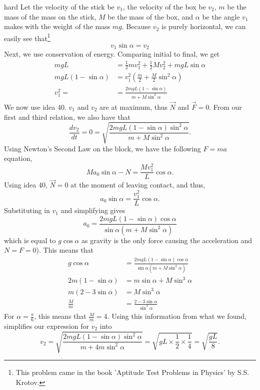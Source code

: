\begin{solution}{hard}
Let the velocity of the stick be $v_1$, the velocity of the box be $v_2$, $m$ be the mass of the mass on the stick, $M$ be the mass of the box, and $\alpha$ be the angle $v_1$ makes with the weight of the mass $mg$. Because $v_2$ is purely horizontal, we can easily see that\footnote{This problem came in the book 'Aptitude Test Problems in Physics' by S.S. Krotov.}
\[v_1\sin\alpha = v_2\]
Next, we use conservation of energy. Comparing initial to final, we get
\begin{align*}
mgL&= \frac{1}{2}mv_1^2 + \frac{1}{2}Mv_2^2 + mgL\sin\alpha\\
mgL(1 - \sin\alpha)&= v_1^2\left(\frac{m}{2} + \frac{M}{2}\sin^2\alpha\right)\\
v_1^2=&= \frac{2mgL(1 - \sin\alpha)}{m + M\sin^2\alpha}
\end{align*}
We now use idea 40. $v_1$ and $v_2$ are at maximum, thus $\vec{N}$ and $\vec{F} = 0$. From our first and third relation, we also have that 
\[\frac{dv_2}{dt} = 0 = \sqrt{\frac{2mgL(1 - \sin\alpha)\sin^2\alpha}{m + M\sin^2\alpha}}.\]
Using Newton's Second Law on the block, we have the following $F=ma$ equation,
\[Ma_0\sin\alpha - N = \frac{Mv_1^2}{L}\cos\alpha.\]
Using idea 40, $\vec{N} = 0$ at the moment of leaving contact, and thus, 
\[a_0\sin\alpha = \frac{v_1^2}{L}\cos\alpha.\]
Substituting in $v_1$ and simplifying gives 
\[a_0 = \frac{2mgL(1 - \sin\alpha)\cos\alpha}{\sin\alpha(m + M\sin^2\alpha)}\]
which is equal to $g\cos\alpha$ as gravity is the only force causing the  acceleration and $N = F = 0$). This means that 
\begin{align*}
g\cos\alpha&= \frac{2mgL(1 - \sin\alpha)\cos\alpha}{\sin\alpha(m + M\sin^2\alpha)}\\
2m(1 - \sin\alpha)&= m\sin\alpha + M\sin^3\alpha\\
m(2 - 3\sin\alpha)&= M\sin^3\alpha\\
 \frac{M}{m}&= \frac{2 - 3\sin\alpha}{\sin^3\alpha}
\end{align*}
For $\alpha = \frac{\pi}{6}$, this means that $\boxed{\frac{M}{m} = 4}$. Using this information from what we found, simplifies our expression for $v_2$ into 
\[v_2 = \sqrt{\frac{2mgL(1 - \sin\alpha)\sin^2\alpha}{m + 4m\sin^2\alpha}} = \sqrt{gL\times \frac{1}{2}\times\frac{1}{4}} = \boxed{\sqrt{\frac{gL}{8}}}.\]
\end{solution}
